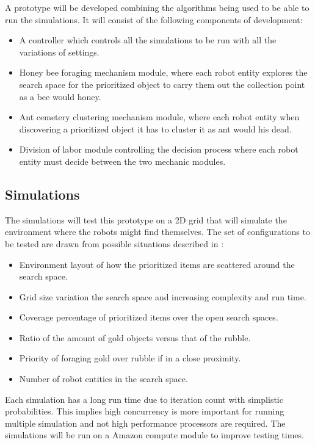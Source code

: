 \documentclass[12pt]{article}
\begin{document}
\par{A prototype will be developed combining the algorithms being used to be able to run the simulations. It will consist of the following components of development:
\begin{itemize}
	\item 	A controller which controls all the simulations to be run with all the 					variations of settings.
	\item 	Honey bee foraging mechanism module, where each robot entity explores 					the search space for the prioritized object to carry them out the 						collection point as a bee would honey.
	\item 	Ant cemetery clustering mechanism module, where each robot entity when 					discovering a prioritized object it has to cluster it as ant would his 					dead.
	\item 	Division of labor module controlling the decision process where each 					robot entity must decide between the two mechanic modules.
\end{itemize}
}

\subsection{Simulations}

\par{The simulations will test this prototype on a 2D grid that will simulate the environment where the robots might find themselves. The set of configurations to be tested are drawn from possible situations described in \cite{Jade-2014}:}
\begin{itemize}
	\item 	Environment layout of how the prioritized items are scattered around the 				search space.
	\item	Grid size variation the search space and increasing complexity and run 					time.
	\item	Coverage percentage of prioritized items over the open search spaces.
	\item	Ratio of the amount of gold objects versus that of the rubble.
	\item	Priority of foraging gold over rubble if in a close proximity.
	\item	Number of robot entities in the search space.
\end{itemize} 
\par{Each simulation has a long run time due to iteration count with simplistic probabilities. This implies high concurrency is more important for running multiple simulation and not high performance processors are required. The simulations will be run on a Amazon compute module to improve testing times.}
\end{document}

